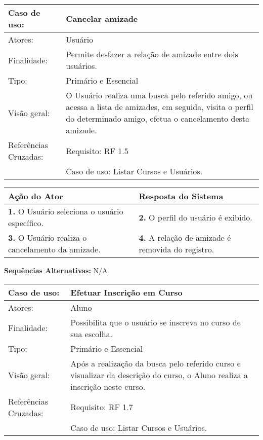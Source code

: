 \documentclass[12pt,a4paper,onecolumn,titlepage]{article}
\begin{document}
\begin{table}[h!]
\begin{center}
\begin{tabular}{p{2.5cm} p{9.5cm}}
Caso de uso: & \textbf{Cancelar amizade} \\ \hline
Atores: & Usuário \\ \hline
Finalidade: & Permite desfazer a relação de amizade entre dois usuários. \\ \hline
Tipo: & Primário e Essencial\\ \hline
Visão geral: & O Usuário realiza uma busca pelo referido amigo, ou acessa a lista de amizades, em seguida, visita o perfil do determinado amigo, efetua o cancelamento desta amizade. \\ \hline
Referências Cruzadas: & Requisito: RF 1.5 \\ & Caso de uso: Listar Cursos e Usuários.

\end{tabular}
\end{center}
\end{table}


\begin{center}
\def\arraystretch{1.1}
\begin{tabular}{|p{6cm}|p{6cm}|}

\hline
\textbf{Ação do Ator} & \textbf{Resposta do Sistema} \\ \hline
\textbf{1.} O Usuário seleciona o usuário específico. & \textbf{2.} O perfil do usuário é exibido. \\ \hline
\textbf{3.} O Usuário realiza o cancelamento da amizade. & \textbf{4.} A relação de amizade é removida do registro.\\ \hline
\end{tabular}
\end{center}
\textbf{Sequências Alternativas:} N/A
\newpage




\begin{table}[h!]
\begin{center}
\begin{tabular}{p{2.5cm} p{9.5cm}}
Caso de uso: & \textbf{Efetuar Inscrição em Curso} \\ \hline
Atores: & Aluno \\ \hline
Finalidade: & Possibilita que o usuário se inscreva no curso de sua escolha. \\ \hline
Tipo: & Primário e Essencial\\ \hline
Visão geral: & Após a realização da busca pelo referido curso e visualizar da descrição do curso, o Aluno realiza a inscrição neste curso. \\ \hline
Referências Cruzadas: & Requisito: RF 1.7 \\ & Caso de uso: Listar Cursos e Usuários.

\end{tabular}
\end{center}
\end{table}
\end{document}
